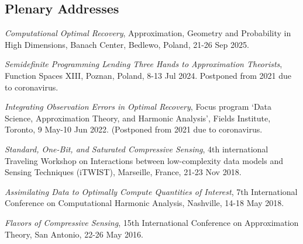 \documentclass[11pt]{article}
\begin{document}
\subsection{Plenary Addresses}
\bitemize
\item {\sl Computational Optimal Recovery}, Approximation, Geometry and Probability in High Dimensions, Banach Center, Bedlewo, Poland,
21-26 Sep 2025.
\item {\sl Semidefinite Programming Lending Three Hands to Approximation Theorists}, Function Spaces XIII, Poznan, Poland,  8-13 Jul 2024.
{\small Postponed  from 2021 due to coronavirus.} %
\item {\sl Integrating Observation Errors in Optimal Recovery}, Focus program `Data Science, Approximation Theory, and Harmonic Analysis', Fields Institute, Toronto,  9 May-10 Jun 2022.
{\small (Postponed from 2021 due to coronavirus.} %
\item {\sl Standard, One-Bit, and Saturated Compressive Sensing}, 4th international Traveling Workshop on Interactions between low-complexity data models and Sensing Techniques (iTWIST),
Marseille, France, 21-23 Nov 2018.
\item {\sl Assimilating Data to Optimally Compute Quantities of Interest}, 7th International Conference on Computational Harmonic Analysis,
Nashville, 14-18 May 2018.
\item {\sl Flavors of Compressive Sensing}, 
15th International Conference on Approximation Theory, San Antonio, 22-26 May 2016.
\eitemize
\end{document}
